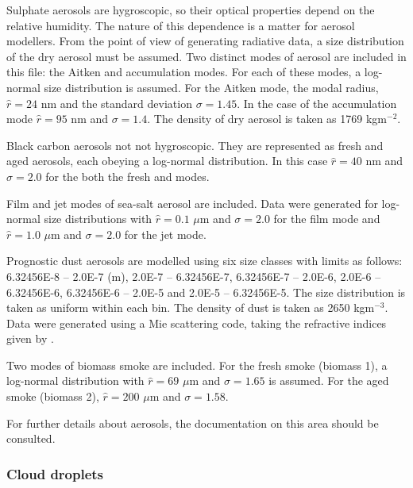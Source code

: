 Sulphate aerosols are hygroscopic, so their optical properties depend on
the relative humidity. The nature of this dependence is a matter for
aerosol modellers. From the point of view of generating radiative data,
a size distribution of the dry aerosol must be assumed. Two distinct
modes of aerosol are included in this file: the Aitken and accumulation
modes. For each of these modes, a log-normal size distribution is assumed.
For the Aitken mode, the modal radius, $\hat r = 24$ nm and the 
standard deviation $\sigma=1.45$. In the case of the accumulation mode
$\hat r = 95$ nm and $\sigma=1.4$. The density of dry aerosol is taken
as 1769 kgm${}^{-2}$.

Black carbon aerosols not not hygroscopic. They are represented as fresh
and aged aerosols, each obeying a log-normal distribution. In this case
$\hat r = 40$ nm and $\sigma=2.0$ for the both the fresh and modes.

Film and jet modes of sea-salt aerosol are included. Data were generated 
for log-normal size distributions with $\hat r=0.1$ $\mu$m and
$\sigma=2.0$ for the film mode and $\hat r=1.0$ $\mu$m and $\sigma=2.0$
for the jet mode.

Prognostic dust aerosols are modelled using six size classes with limits as
follows: 6.32456E-8 -- 2.0E-7 (m), 2.0E-7 -- 6.32456E-7, 
6.32456E-7 -- 2.0E-6, 2.0E-6 -- 6.32456E-6, 6.32456E-6 -- 2.0E-5 and
2.0E-5 -- 6.32456E-5. The size distribution is taken as uniform within
each bin. The density of dust is taken as 2650 kgm${}^{-3}$. Data were
generated using a Mie scattering code, taking the refractive indices
given by \citet{Deepak83}.

Two modes of biomass smoke are included. For the fresh smoke (biomass 1),
a log-normal distribution with $\hat r=69$ $\mu$m and $\sigma=1.65$ is
assumed. For the aged smoke (biomass 2), $\hat r=200$ $\mu$m and $\sigma=1.58$.

For further details about aerosols, the documentation on this area should
be consulted.

\subsubsection*{Cloud droplets}

